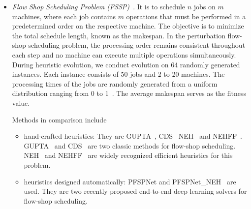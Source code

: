 \begin{itemize}
    Methods in comparison include 
    \begin{itemize}
    \item hand-crafted heuristics: The nearest insertion\cite{rosenkrantz1977analysis} and farthest insertion~\cite{rosenkrantz1977analysis}, two commonly used constructive heuristics are used in comparison. Google Or-Tools~\cite{ortools}, one of the most popular solvers is also used.  We use the default settings of Or-Tools and the local search option suggested in OR-Tools to improve the solution quality. The stopping criterion is 60s for each instance.
    
    \item heuristics designed automatically by AI methods: they are the attention model (AM)~\cite{kool2018attention}, POMO~\cite{kwon2020pomo} and LEHD~\cite{luo2023neural}. AM~\cite{kool2018attention} is a seminal and well-known method for using neural networks to learn heuristics for combinatorial optimization. POMO~\cite{kwon2020pomo} adopts AM ideas and achieves state-of-the-art results. LEHD~\cite{luo2023neural} is a new revision of AM with a different heavy decoder structure and is trained using supervised learning. 
    \end{itemize}
    
    \item \textit{Flow Shop Scheduling Problem (FSSP)~\cite{emmons2012flow}}. It is to schedule $n$ jobs on $m$ machines, where each job contains $m$ operations that must be performed in a predetermined order on the respective machine. The objective is to minimize the total schedule length, known as the makespan. In the perturbation flow-shop scheduling problem, the processing order remains consistent throughout each step and no machine can execute multiple operations simultaneously. During heuristic evolution, we conduct evolution on 64 randomly generated instances. Each instance consists of 50 jobs and 2 to 20 machines. The processing times of the jobs are randomly generated from a uniform distribution ranging from 0 to 1~\cite{pan2021deep}. The average makespan serves as the fitness value. 
    
    Methods in comparison include
    \begin{itemize}
    \item hand-crafted heuristics: They are GUPTA~\cite{gupta1971functional},  CDS~\cite{campbell1970heuristic}
    NEH~\cite{nawaz1983heuristic} and NEHFF~\cite{fernandez2014insertion}.
    GUPTA~\cite{gupta1971functional} and  CDS~\cite{campbell1970heuristic}
    are two classic methods for flow-shop scheduling.  NEH~\cite{nawaz1983heuristic} and NEHFF~\cite{fernandez2014insertion} are widely recognized efficient heuristics for this problem. 
    \item heuristics designed automatically: PFSPNet and PFSPNet\_NEH~\cite{pan2021deep} are used. They are two recently proposed end-to-end deep learning solvers for flow-shop scheduling.
    \end{itemize}
    \end{itemize}

